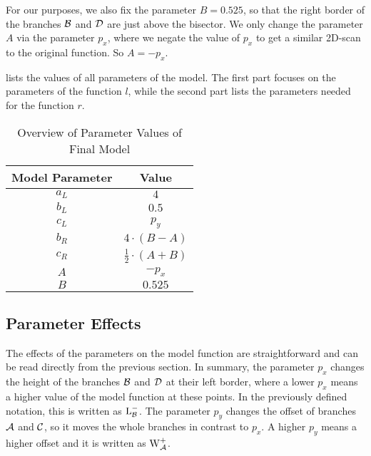 For our purposes, we also fix the parameter $B = 0.525$, so that the right border of the branches $\mathcal{B}$ and $\mathcal{D}$ are just above the bisector.
We only change the parameter $A$ via the parameter $p_x$, where we negate the value of $p_x$ to get a similar 2D-scan to the original function.
So $A = -p_x$.

 lists the values of all parameters of the model.
The first part focuses on the parameters of the function $l$, while the second part lists the parameters needed for the function $r$.

\begin{table}
    \centering
    \begin{tabular}{|c|c|}
        \hline
        Model Parameter & Value                       \\ \hline \hline
        $a_L$           & $4$                         \\ \hline
        $b_L$           & $0.5$                       \\ \hline
        $c_L$           & $p_y$                       \\ \hline \hline
        $b_R$           & $4 \cdot (B - A)$           \\ \hline
        $c_R$           & $\frac{1}{2} \cdot (A + B)$ \\ \hline
        $A$             & $-p_x$                      \\ \hline
        $B$             & $0.525$                     \\ \hline
    \end{tabular}
    \caption{Overview of Parameter Values of Final Model}
    \label{tab:final.def.parameters.overview}
\end{table}

\subsection{Parameter Effects}

The effects of the parameters on the model function are straightforward and can be read directly from the previous section.
In summary, the parameter $p_x$ changes the height of the branches $\mathcal{B}$ and $\mathcal{D}$ at their left border, where a lower $p_x$ means a higher value of the model function at these points.
In the previously defined notation, this is written as $\operatorname{L}_{\mathcal{B}}^-$.
The parameter $p_y$ changes the offset of branches $\mathcal{A}$ and $\mathcal{C}$, so it moves the whole branches in contrast to $p_x$.
A higher $p_y$ means a higher offset and it is written as $\operatorname{W}_{\mathcal{A}}^+$.

